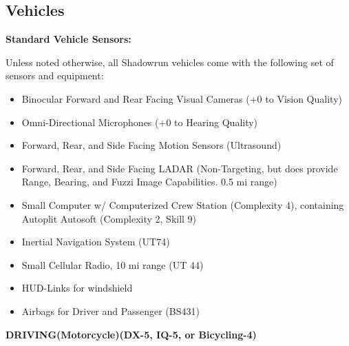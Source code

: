 \subsection{Vehicles}

\textbf{Standard Vehicle Sensors:}

Unless noted otherwise, all Shadowrun vehicles come with the following set of sensors and equipment:

\begin{itemize}
	\itemsep 0pt
	\item Binocular Forward and Rear Facing Visual Cameras (+0 to Vision Quality)
	\item Omni-Directional Microphones (+0 to Hearing Quality)
	\item Forward, Rear, and Side Facing Motion Sensors (Ultrasound)
	\item Forward, Rear, and Side Facing LADAR (Non-Targeting, but does provide Range, Bearing, and Fuzzi Image Capabilities. 0.5 mi range)
	\item Small Computer w/ Computerized Crew Station (Complexity 4), containing Autoplit Autosoft (Complexity 2, Skill 9)
	\item Inertial Navigation System (UT74) 
	\item Small Cellular Radio, 10 mi range (UT 44)
	\item HUD-Links for windshield
	\item Airbags for Driver and Passenger (BS431)
\end{itemize}

\textbf{DRIVING(Motorcycle)(DX-5, IQ-5, or Bicycling-4)}
\begin{center} 
	\begin{adjustwidth}{-9.5mm}{}
	\end{adjustwidth}
\end{center}


